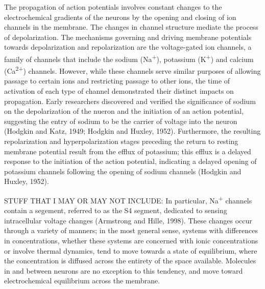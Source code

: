 \documentclass[11pt]{article}
\begin{document}
The propagation of action potentials involves constant changes to the electrochemical gradients of the neurons by the opening and closing of ion channels in the membrane. The changes in channel structure mediate the process of depolarization. The mechanisms governing and driving membrane potentials towards depolarization and repolarization are the voltage-gated ion channels, a family of channels that include the sodium (Na\textsuperscript{+}), potassium (K\textsuperscript{+}) and calcium (Ca\textsuperscript{2+}) channels. However, while these channels serve similar purposes of allowing passage to certain ions and restricting passage to other ions, the time of activation of each type of channel demonstrated their distinct impacts on propagation. Early researchers discovered and verified the significance of sodium on the depolarization of the nueron and the initiation of an action potential, suggesting the entry of sodium to be the carrier of voltage into the neuron (Hodgkin and Katz, 1949; Hodgkin and Huxley, 1952). Furthermore, the resulting repolarization and hyperpolarization stages preceding the return to resting membrane potential result from the efflux of potassium; this efflux is a delayed response to the initiation of the action potential, indicating a delayed opening of potassium channels following the opening of sodium channels (Hodgkin and Huxley, 1952).

STUFF THAT I MAY OR MAY NOT INCLUDE:
In particular, Na\textsuperscript{+} channels contain a segement, referred to as the S4 segment, dedicated to sensing intracellular voltage changes (Armstrong and Hille, 1998).  These changes occur through a variety of manners; in the most general sense, systems with differences in concentrations, whether these systems are concerned with ionic concentrations or involve thermal dynamics, tend to move towards a state of equilibrium, where the concentration is diffused across the entirety of the space available. Molecules in and between neurons are no exception to this tendency, and move toward electrochemical equilibrium across the membrane.\par
\end{document}
